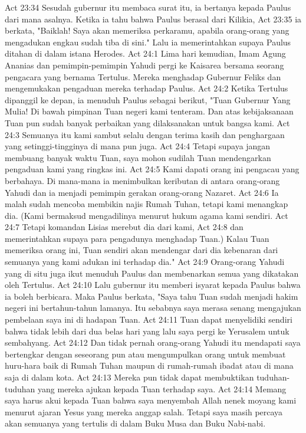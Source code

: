 Act 23:34  Sesudah gubernur itu membaca surat itu, ia bertanya kepada Paulus dari mana asalnya. Ketika ia tahu bahwa Paulus berasal dari Kilikia,
Act 23:35  ia berkata, "Baiklah! Saya akan memeriksa perkaramu, apabila orang-orang yang mengadukan engkau sudah tiba di sini." Lalu ia memerintahkan supaya Paulus ditahan di dalam istana Herodes.
Act 24:1  Lima hari kemudian, Imam Agung Ananias dan pemimpin-pemimpin Yahudi pergi ke Kaisarea bersama seorang pengacara yang bernama Tertulus. Mereka menghadap Gubernur Feliks dan mengemukakan pengaduan mereka terhadap Paulus.
Act 24:2  Ketika Tertulus dipanggil ke depan, ia menuduh Paulus sebagai berikut, "Tuan Gubernur Yang Mulia! Di bawah pimpinan Tuan negeri kami tenteram. Dan atas kebijaksanaan Tuan pun sudah banyak perbaikan yang dilaksanakan untuk bangsa kami.
Act 24:3  Semuanya itu kami sambut selalu dengan terima kasih dan penghargaan yang setinggi-tingginya di mana pun juga.
Act 24:4  Tetapi supaya jangan membuang banyak waktu Tuan, saya mohon sudilah Tuan mendengarkan pengaduan kami yang ringkas ini.
Act 24:5  Kami dapati orang ini pengacau yang berbahaya. Di mana-mana ia menimbulkan keributan di antara orang-orang Yahudi dan ia menjadi pemimpin gerakan orang-orang Nazaret.
Act 24:6  Ia malah sudah mencoba membikin najis Rumah Tuhan, tetapi kami menangkap dia. (Kami bermaksud mengadilinya menurut hukum agama kami sendiri.
Act 24:7  Tetapi komandan Lisias merebut dia dari kami,
Act 24:8  dan memerintahkan supaya para pengadunya menghadap Tuan.) Kalau Tuan memeriksa orang ini, Tuan sendiri akan mendengar dari dia kebenaran dari semuanya yang kami adukan ini terhadap dia."
Act 24:9  Orang-orang Yahudi yang di situ juga ikut menuduh Paulus dan membenarkan semua yang dikatakan oleh Tertulus.
Act 24:10  Lalu gubernur itu memberi isyarat kepada Paulus bahwa ia boleh berbicara. Maka Paulus berkata, "Saya tahu Tuan sudah menjadi hakim negeri ini bertahun-tahun lamanya. Itu sebabnya saya merasa senang mengajukan pembelaan saya ini di hadapan Tuan.
Act 24:11  Tuan dapat menyelidiki sendiri bahwa tidak lebih dari dua belas hari yang lalu saya pergi ke Yerusalem untuk sembahyang.
Act 24:12  Dan tidak pernah orang-orang Yahudi itu mendapati saya bertengkar dengan seseorang pun atau mengumpulkan orang untuk membuat huru-hara baik di Rumah Tuhan maupun di rumah-rumah ibadat atau di mana saja di dalam kota.
Act 24:13  Mereka pun tidak dapat membuktikan tuduhan-tuduhan yang mereka ajukan kepada Tuan terhadap saya.
Act 24:14  Memang saya harus akui kepada Tuan bahwa saya menyembah Allah nenek moyang kami menurut ajaran Yesus yang mereka anggap salah. Tetapi saya masih percaya akan semuanya yang tertulis di dalam Buku Musa dan Buku Nabi-nabi.
